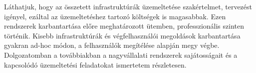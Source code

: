 Láthatjuk, hogy az összetett infrastruktúrák üzemeltetése szakértelmet, tervezést igényel, ezáltal az üzemeltetéshez tartozó költségek is magasabbak. Ezen rendszerek karbantartása előre meghatározott ütemben, professzionális szinten történik. Kisebb infrastruktúrák és végfelhasználói megoldások karbantartása gyakran ad-hoc módon, a felhasználók megítélése alapján megy végbe. Dolgozatomban a továbbiakban a nagyvállalati rendszerek sajátosságait és a kapcsolódó üzemeltetési feladatokat ismertetem részletesen.

